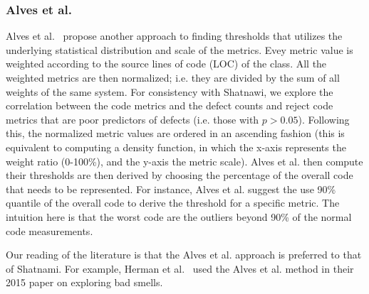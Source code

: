 \documentclass{sig-alternate}
\begin{document}
\subsubsection{ Alves et al.}
Alves et al.~\cite{Alves2010} propose another approach
to finding thresholds that  utilizes the underlying statistical distribution and scale of the metrics. 
Evey metric value is weighted according to the source lines of code (LOC) of the class. All the weighted metrics are then normalized; i.e. they are divided by the sum of all weights of the same system. For consistency
with Shatnawi, we explore the correlation between
the code metrics and the defect counts and   reject code metrics that are poor predictors of defects (i.e.   those  with $p > 0.05$).
Following this, the normalized metric values are ordered in an ascending fashion (this is equivalent to computing a density function, in which the x-axis represents the weight ratio (0-100\%), and the y-axis the metric scale).
Alves et al. then compute their 
thresholds are then derived by choosing the percentage of the overall code that needs to be represented. For instance, Alves et al. suggest the use 90\% quantile of the overall code to derive the threshold for a specific metric. The intuition here is that the worst
code are the outliers beyond 90\% of the normal code measurements.

Our reading of the literature is that the Alves et al.  
approach is preferred to that of Shatnami. For example, Herman et al.~\cite{hermans15} used the
Alves et al. method in their  2015 paper on
exploring bad smells.
\end{document}
